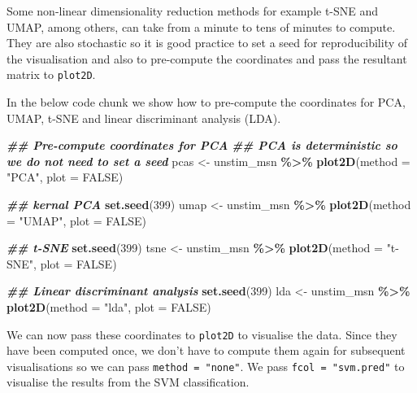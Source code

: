\documentclass[9pt,a4paper,]{extarticle}
\newenvironment{Shaded}{\begin{snugshade}}{\end{snugshade}}
\newcommand{\AttributeTok}[1]{\textcolor[rgb]{0.13,0.29,0.53}{#1}}
\newcommand{\ConstantTok}[1]{\textcolor[rgb]{0.56,0.35,0.01}{#1}}
\newcommand{\DecValTok}[1]{\textcolor[rgb]{0.00,0.00,0.81}{#1}}
\newcommand{\DocumentationTok}[1]{\textcolor[rgb]{0.56,0.35,0.01}{\textbf{\textit{#1}}}}
\newcommand{\FunctionTok}[1]{\textcolor[rgb]{0.13,0.29,0.53}{\textbf{#1}}}
\newcommand{\NormalTok}[1]{#1}
\newcommand{\OtherTok}[1]{\textcolor[rgb]{0.56,0.35,0.01}{#1}}
\newcommand{\SpecialCharTok}[1]{\textcolor[rgb]{0.81,0.36,0.00}{\textbf{#1}}}
\newcommand{\StringTok}[1]{\textcolor[rgb]{0.31,0.60,0.02}{#1}}
\begin{document}
Some non-linear dimensionality reduction methods for example t-SNE and UMAP,
among others, can take from a minute to tens of minutes to compute. They
are also stochastic so it is good practice to set a seed for reproducibility of
the visualisation and also to pre-compute the coordinates and pass the
resultant matrix to \texttt{plot2D}.

In the below code chunk we show how to pre-compute the coordinates for PCA,
UMAP, t-SNE and linear discriminant analysis (LDA).

\begin{Shaded}
\begin{Highlighting}[]
\DocumentationTok{\#\# Pre{-}compute coordinates for PCA}
\DocumentationTok{\#\# PCA is deterministic so we do not need to set a seed}
\NormalTok{pcas }\OtherTok{\textless{}{-}}\NormalTok{ unstim\_msn }\SpecialCharTok{\%\textgreater{}\%}
  \FunctionTok{plot2D}\NormalTok{(}\AttributeTok{method =} \StringTok{"PCA"}\NormalTok{, }\AttributeTok{plot =} \ConstantTok{FALSE}\NormalTok{)}

\DocumentationTok{\#\# kernal PCA}
\FunctionTok{set.seed}\NormalTok{(}\DecValTok{399}\NormalTok{)}
\NormalTok{umap }\OtherTok{\textless{}{-}}\NormalTok{ unstim\_msn }\SpecialCharTok{\%\textgreater{}\%}
  \FunctionTok{plot2D}\NormalTok{(}\AttributeTok{method =} \StringTok{"UMAP"}\NormalTok{, }\AttributeTok{plot =} \ConstantTok{FALSE}\NormalTok{)}

\DocumentationTok{\#\# t{-}SNE}
\FunctionTok{set.seed}\NormalTok{(}\DecValTok{399}\NormalTok{)}
\NormalTok{tsne }\OtherTok{\textless{}{-}}\NormalTok{ unstim\_msn }\SpecialCharTok{\%\textgreater{}\%} 
  \FunctionTok{plot2D}\NormalTok{(}\AttributeTok{method =} \StringTok{"t{-}SNE"}\NormalTok{, }\AttributeTok{plot =} \ConstantTok{FALSE}\NormalTok{)}

\DocumentationTok{\#\# Linear discriminant analysis}
\FunctionTok{set.seed}\NormalTok{(}\DecValTok{399}\NormalTok{)}
\NormalTok{lda }\OtherTok{\textless{}{-}}\NormalTok{ unstim\_msn }\SpecialCharTok{\%\textgreater{}\%}
  \FunctionTok{plot2D}\NormalTok{(}\AttributeTok{method =} \StringTok{"lda"}\NormalTok{, }\AttributeTok{plot =} \ConstantTok{FALSE}\NormalTok{)}
\end{Highlighting}
\end{Shaded}

We can now pass these coordinates to \texttt{plot2D} to visualise the data. Since they
have been computed once, we don't have to compute them again for subsequent
visualisations so we can pass \texttt{method\ =\ "none"}. We pass \texttt{fcol\ =\ "svm.pred"}
to visualise the results from the SVM classification.
\end{document}
